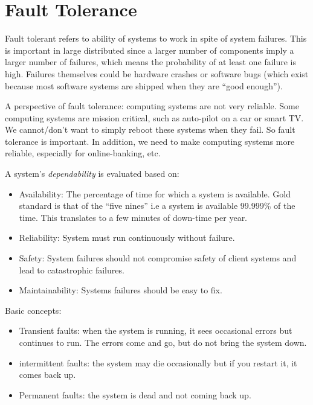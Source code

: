\documentclass[twoside]{article}
\begin{document}
% 

\section{Fault Tolerance}

Fault tolerant refers to ability of systems to work in spite of system failures. This is important in large distributed since a larger number of components imply a larger number of failures, which means the probability of at least one failure is high. Failures themselves could be hardware crashes or software bugs (which exist because most software systems are shipped when they are ``good enough'').

A perspective of fault tolerance: computing systems are not very reliable. Some computing systems are mission critical, such as auto-pilot on a car or smart TV. We cannot/don't want to simply reboot these systems when they fail. So fault tolerance is important. In addition, we need to make computing systems more reliable, especially for online-banking, etc.

A system's \textit{dependability} is evaluated based on:
\begin{itemize}
  \item Availability: The percentage of time for which a system is available. Gold standard is that of the ``five nines'' i.e a system is available 99.999\% of the time. This translates to a few minutes of down-time per year.
  \item Reliability: System must run continuously without failure.
  \item Safety: System failures should not compromise safety of client systems and lead to catastrophic failures.
  \item Maintainability: Systems failures should be easy to fix.
\end{itemize}

Basic concepts:
\begin{itemize}
    \item Transient faults: when the system is running, it sees occasional errors but continues to run. The errors come and go, but do not bring the system down.
    \item intermittent faults: the system may die occasionally but if you restart it, it comes back up.
    \item Permanent faults: the system is dead and not coming back up.
\end{itemize}
\end{document}
